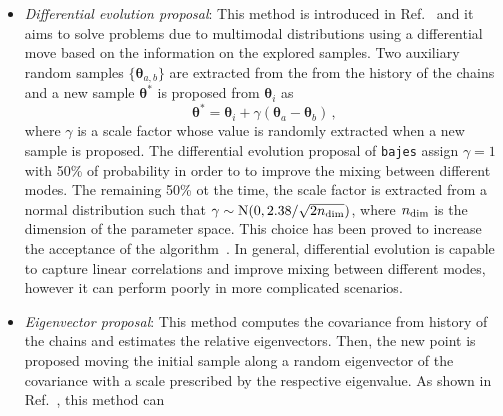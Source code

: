 \documentclass[prd,aps,twocolumn,a4paper,showkeys,nofootinbib,floatfix]{revtex4-1}
\newcommand{\be}{\begin{equation}}
\newcommand{\ee}{\end{equation}}
\def\params{\boldsymbol{\theta}}
\def\paramspace{\boldsymbol{\Theta}}
\newcommand{\bajes}{{\tt bajes}}
\begin{document}
\begin{itemize}
A subset of $N$ auxiliary points 
$\bar \paramspace\equiv\{\bar\params_k\}$ is randomly chosen from the 
history of the chains and it is used to identify a probability distribution $p(\params|\bar \paramspace)$ from which the new samples will be extracted.
The idea is to estimate $p(\params|\bar \paramspace)$ such that is it capable to 
approximate the target distribution, increasing the acceptance.
Moreover, the estimation can be refined and adapted during the 
exploration of the parameter space.
In order to estimate $p(\params|\bar \paramspace)$, the replacement proposal
implemented in {\bajes} employs a Gaussian kernel density estimation
with $N=25$.
However, this method does not access to unexplored regions of 
the parameter space, with the possibility of leading to highly correlated chains. 
Furthermore, this method is not symmetric and the proposal distribution
is described by $p(\params|\bar \paramspace)$.
\item {\it Differential evolution proposal}: This method is introduced in Ref.~\cite{Nelson_2013} and it aims to solve problems due to multimodal distributions
using a differential move based on the information on the explored samples.
Two auxiliary random samples $\{\params_{a,b}\}$ 
are extracted from the 
from the history of the chains
and a new sample $\params^*$
is proposed from $\params_i$ as 
\be
\label{eq:de_prop}
\params^* = \params_i + \gamma \left(\params_a - \params_b\right)\,,
\ee
where $\gamma$ is a scale factor
whose value is randomly extracted when a new sample is proposed.
The differential evolution proposal of {\bajes} assign $\gamma=1$ 
with 50\% of probability in order to
to improve the mixing between different modes. 
The remaining 50\% ot the time, the scale factor is extracted from a 
normal distribution such that $\gamma\sim {\rm N}(0,2.38 /\sqrt{2n_{\rm dim}})$, 
where $n_{\rm dim}$ is the dimension of the parameter space.
This choice has been proved to increase the acceptance of the algorithm~\cite{DEprop1,DEprop2}.
In general, differential evolution is capable to capture 
linear correlations and improve mixing between 
different modes, however it can perform poorly in
more complicated scenarios.
\item {\it Eigenvector proposal}: This method computes the covariance
from history of the chains and estimates the relative 
eigenvectors. Then, the new point is proposed moving the
initial sample along a random eigenvector of the covariance
with a scale prescribed by the respective eigenvalue.
As shown in Ref.~\cite{Veitch:2014wba}, this method can

\end{itemize}
\end{document}
